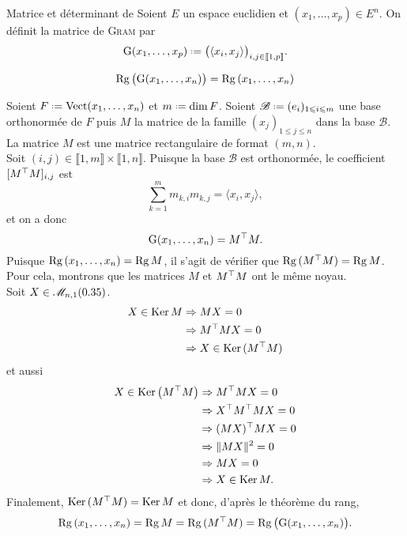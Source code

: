 \begin{defi}{Matrice et déterminant de }
    Soient $E$ un espace euclidien et $(x_1, \dots, x_p) \in E^n$. On définit la matrice de \textsc{Gram} par
    $$\Gram(x_1, \dots, x_p) \defeq \big( \langle x_i, x_j \rangle \big)_{i,j \in \llbracket 1, p \rrbracket}.$$
\end{defi}


\begin{prop}{}
    $$\mathrm{Rg}\, \big( \mathrm{G}(x_1, \dots, x_n) \big) = \mathrm{Rg}\,(x_1, \dots, x_n)$$
\end{prop}

\begin{preuve}
    Soient $F \defeq \Vect(x_1, \dots, x_n)$ et $m \defeq \dim F$. Soient $\mathscr{B} \defeq (e_i)_{1 \leqslant i \leqslant m}$ une base orthonormée de $F$ puis $M$ la matrice de la famille $(x_j)_{1 \leqslant j \leqslant n}$ dans la base $\mathscr{B}$. La matrice $M$ est une matrice rectangulaire de format $(m, n)$. \\
    Soit $(i, j) \in \llbracket 1, m \rrbracket \times \llbracket 1, n \rrbracket$. Puisque la base $\mathscr{B}$ est orthonormée, le coefficient $[ M^\top M ]_{i,j}$ est 
    $$\sum_{k=1}^m m_{k,i} m_{k,j} = \langle x_i, x_j \rangle,$$
    et on a donc
    $$\mathrm{G}(x_1, \dots, x_n) = M^\top M.$$
    Puisque $\mathrm{Rg}\,(x_1, \dots, x_n) = \mathrm{Rg}\, M$, il s'agit de vérifier que $\mathrm{Rg}\,(M^\top M) = \mathrm{Rg}\, M$. Pour cela, montrons que les matrices $M$ et $M^\top M$ ont le même noyau. \\
    Soit $X \in \mathscr{M}_{n,1}(0.35)$.
    \begin{align*}
        X \in \mathrm{Ker}\, M &\Rightarrow MX = 0 \\
        &\Rightarrow M^\top MX = 0 \\
        &\Rightarrow X \in \mathrm{Ker}\,(M^\top M)
    \end{align*}
    et aussi
    \begin{align*}
        X \in \mathrm{Ker}\, \big( M^\top M \big) &\Rightarrow M^\top MX = 0 \\
        &\Rightarrow X^\top M^\top MX = 0 \\
        &\Rightarrow (MX)^\top MX = 0 \\
        &\Rightarrow \Vert MX \Vert^2 = 0 \\
        &\Rightarrow MX = 0 \\
        &\Rightarrow X \in \mathrm{Ker}\, M.
    \end{align*}
    Finalement, $\mathrm{Ker}\,(M^\top M) = \mathrm{Ker}\, M$ et donc, d'après le théorème du rang,
    $$\mathrm{Rg}\,(x_1, \dots, x_n) = \mathrm{Rg}\, M = \mathrm{Rg}\,(M^\top M) = \mathrm{Rg}\, \big( \mathrm{G}(x_1, \dots, x_n) \big).$$
\end{preuve}

